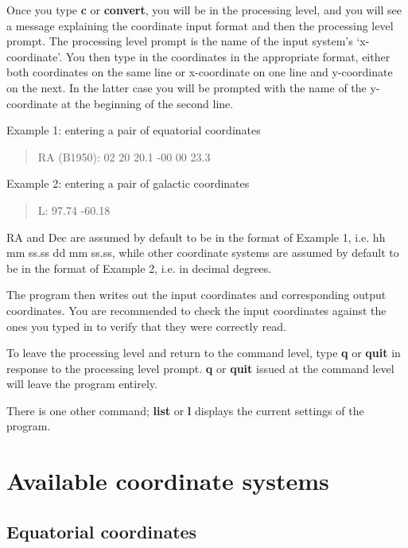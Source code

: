 Once you type {\bf c} or {\bf convert}, you will be 
in the processing level, and you will see a message explaining the coordinate
input format and then the processing level prompt. The processing level
prompt is the name of the input system's `x-coordinate'. You then 
type in the coordinates in the appropriate format, either both coordinates
on the same line or x-coordinate on one line and y-coordinate on the next.
In the latter case you will be prompted with the name of the y-coordinate
at the beginning of the second line.


Example 1: entering a pair of equatorial coordinates\begin{quote}
RA (B1950): 02 20 20.1 -00 00 23.3
\end{quote}
Example 2: entering a pair of galactic coordinates\begin{quote}
L: 97.74 -60.18
\end{quote}

RA and Dec are assumed by default to be in the format of Example 1,
i.e. hh mm ss.ss dd mm ss.ss, while other coordinate systems
are assumed by default to be in the format of Example 2, i.e.
in decimal degrees.

The program then writes out the input coordinates and corresponding
output coordinates. You are recommended to check the input coordinates
against the ones you typed in to verify that they were correctly read.

To leave the processing level and return to the command level, type
{\bf q} or {\bf quit} in response to the processing level prompt.
{\bf q} or {\bf quit} issued at the command 
level will leave the program entirely.


There is one other command; {\bf list} or {\bf l} displays the
current settings of the program.

\section{Available coordinate systems}

\subsection{Equatorial coordinates}

